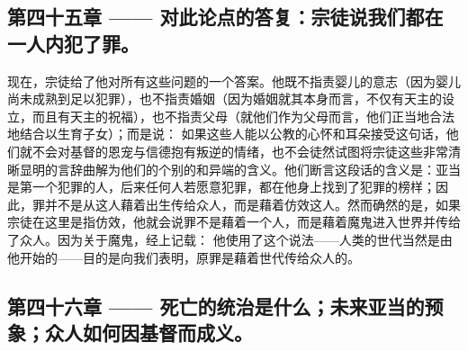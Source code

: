 \subsection{第四十五章 —— 对此论点的答复：宗徒说我们都在一人内犯了罪。}

现在，宗徒给了他对所有这些问题的一个答案。他既不指责婴儿的意志（因为婴儿尚未成熟到足以犯罪），也不指责婚姻（因为婚姻就其本身而言，不仅有天主的设立，而且有天主的祝福），也不指责父母（就他们作为父母而言，他们正当地合法地结合以生育子女）；而是说： 如果这些人能以公教的心怀和耳朵接受这句话，他们就不会对基督的恩宠与信德抱有叛逆的情绪，也不会徒然试图将宗徒这些非常清晰显明的言辞曲解为他们的个别的和异端的含义。他们断言这段话的含义是：亚当是第一个犯罪的人，后来任何人若愿意犯罪，都在他身上找到了犯罪的榜样；因此，罪并不是从这人藉着出生传给众人，而是藉着仿效这人。然而确然的是，如果宗徒在这里是指仿效，他就会说罪不是藉着一个人，而是藉着魔鬼进入世界并传给了众人。因为关于魔鬼，经上记载： 他使用了这个说法——人类的世代当然是由他开始的——目的是向我们表明，原罪是藉着世代传给众人的。\par


\subsection{第四十六章 —— 死亡的统治是什么；未来亚当的预象；众人如何因基督而成义。}

